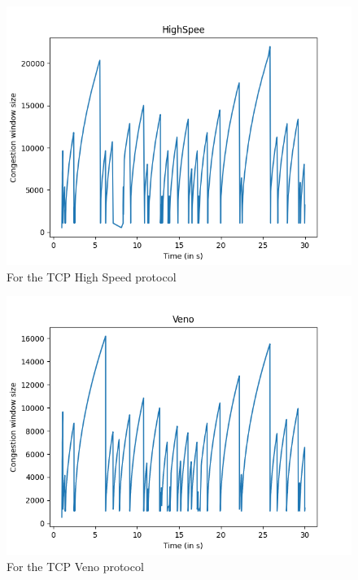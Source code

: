 \documentclass{article}
\begin{document}
\begin{figure}[H]
    \centering
    \includegraphics[scale = 0.8]{Q1/outputs/plots/HighSpee.png}
    \caption{For the TCP High Speed protocol}
\end{figure}

\begin{figure}[H]
    \centering
    \includegraphics[scale = 0.8]{Q1/outputs/plots/Veno.png}
    \caption{For the TCP Veno protocol}
\end{figure}
\end{document}
